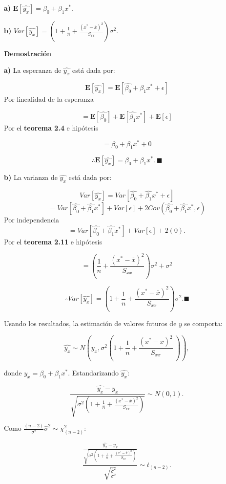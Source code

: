 \documentclass[
  a4paper,
  oneside,
  openany]{book}
\begin{document}
\textbf{a)} \(\mathbf{E}\left[\hat{y_{x}}\right]=\beta_{0}+\beta_{1}x^*.\)

\textbf{b)} \(Var\left[\hat{y_{x}}\right]=\left(1+ \frac{1}{n}+\frac{(x^*-\overline{x})^2}{S_{xx}}\right)\sigma^2.\)

\textbf{Demostración}

\textbf{a)} La esperanza de \(\hat{y_{x}}\) está dada por:

\[\mathbf{E}\left[\hat{y_{x}}\right]=\mathbf {E}\left[\hat{\beta_{0}}+\hat{\beta_{1}}x^*+ \epsilon\right]\]
Por linealidad de la esperanza

\[=\mathbf{E}\left[\hat{\beta_{0}}\right]+\mathbf{E}\left[\hat{\beta_{1}}x^*\right]+ \mathbf{E}\left[\epsilon\right]\]
Por el \textbf{teorema 2.4} e hipótesis

\[=\beta_{0}+\beta_{1}x^*+0\]

\[\therefore \mathbf{E}\left[\hat{y_{x}}\right]=\beta_{0}+\beta_{1}x^*. \ \blacksquare\]

\textbf{b)} La varianza de \(\hat{y_{x}}\) está dada por:

\[Var\left[\hat{y_{x}}\right]=Var\left[\hat{\beta_{0}}+\hat{\beta_{1}}x^*+\epsilon\right]\]
\[=Var\left[\hat{\beta_{0}}+\hat{\beta_{1}}x^*\right]+Var\left[\epsilon\right]+2Cov(\hat{\beta_{0}}+\hat{\beta_{1}}x^*,\epsilon)\]
Por independencia
\[=Var\left[\hat{\beta_{0}}+\hat{\beta_{1}}x^*\right]+Var\left[\epsilon\right]+2(0).\]
Por el \textbf{teorema 2.11} e hipótesis

\[=\left(\frac{1}{n}+\frac{(x^*-\overline{x})^2}{S_{xx}}\right)\sigma^2+\sigma^2\]

\[\therefore Var\left[\hat{y_{x}}\right]=\left(1+ \frac{1}{n}+\frac{(x^*-\overline{x})^2}{S_{xx}}\right)\sigma^2. \blacksquare\]

Usando los resultados, la estimación de valores futuros de \(y\) se comporta:

\[\hat{y_{x}} \sim N \left(y_{x},\sigma^2\left(1+ \frac{1}{n}+\frac{(x^*-\overline{x})^2}{S_{xx}} \ \right)\right),\]

donde \(y_{x}=\beta_{0}+\beta_{1}x^*.\) Estandarizando \(\hat{y_{x}}:\)

\[\frac{\hat{y_{x}}-y_{x}}{\sqrt{\sigma^2\left(1+ \frac{1}{n}+\frac{(x^*-\overline{x})^2}{S_{xx}}\right)}}\sim N (0,1).\]

Como \(\frac{(n-2)}{\sigma^2}\hat{\sigma}^2 \sim \chi^2_{(n-2)}\):

\[\frac{\frac{\hat{y_{x}}-y_{x}}{\sqrt{\sigma^2\left(1+ \frac{1}{n}+\frac{(x^*-\overline{x})^2}{S_{xx}}\right)}}}{\sqrt{\frac{\hat{\sigma}^2}{\sigma^2}}}\sim t_{(n-2)}.\]
\end{document}
